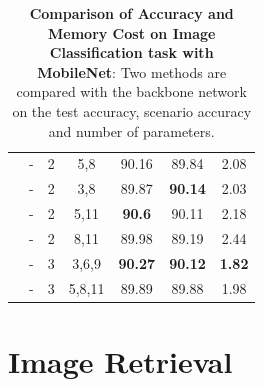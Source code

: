\begin{table}[]
\begin{center}
\begin{tabular}{c||c|c|c||c|c|c}
\cline{2-7} 
& - & 2 & 5,8 & 90.16 & 89.84 & 2.08 \\ 
\cline{2-7} 
& - & 2 & 3,8 & 89.87 & \textbf{90.14} & 2.03 \\ 
\cline{2-7} 
& - & 2 & 5,11 & \textbf{90.6} & 90.11 & 2.18 \\ 
\cline{2-7} 
& - & 2 & 8,11 & 89.98 & 89.19 & 2.44 \\ 
\cline{2-7} 
& - & 3 & 3,6,9 & \textbf{90.27} & \textbf{90.12} & \textbf{1.82} \\ 
\cline{2-7} 
& - & 3 & 5,8,11 & 89.89 & 89.88 & 1.98                                                                   
\end{tabular}
\end{center}
\caption[Comparison of Accuracy and Memory Cost on Image Classification task with VGG16]{\textbf{Comparison of Accuracy and Memory Cost on Image Classification task with MobileNet}: Two methods are compared with the backbone network on the test accuracy, scenario accuracy and number of parameters.}
\label{ic-mobilenetcifar10}
\end{table}


\section{Image Retrieval}

